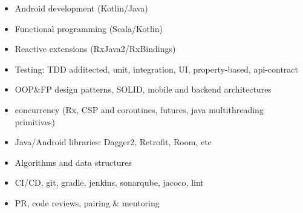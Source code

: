  \begin{multicols}{2}
    \begin{itemize}
	    \item Android development (Kotlin/Java) 
	    \item Functional programming (Scala/Kotlin)
	    \item Reactive extensions (RxJava2/RxBindings) 
	    \item Testing: TDD additected, unit, integration, UI, property-based, api-contract 
	    \item OOP\&FP design patterns, SOLID, mobile and backend architectures
	    \item concurrency (Rx, CSP and coroutines, futures, java multithreading primitives) 
	    \item Java/Android libraries: Dagger2, Retrofit, Room, etc
            \item Algorithms and data structures 
	    \item CI/CD, git, gradle, jenkins, sonarqube, jacoco, lint
	    \item PR, code reviews, pairing \& mentoring 
    \end{itemize}
 \end{multicols}
